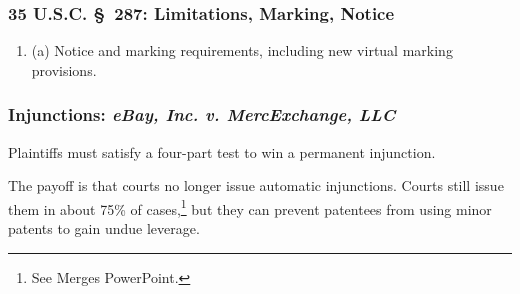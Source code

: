 \subsubsection{35 U.S.C. \S\ 287: Limitations, Marking, Notice}

\begin{enumerate}
    \item (a) Notice and marking requirements, including new virtual marking 
    provisions.
\end{enumerate}

\subsubsection{Injunctions: \emph{eBay, Inc. v. MercExchange, LLC}}

Plaintiffs must satisfy a four-part test to win a permanent injunction.

The payoff is that courts no longer issue automatic injunctions. Courts still 
issue them in about 75\% of cases,\footnote{See Merges PowerPoint.} but they 
can prevent patentees from using minor patents to gain undue leverage.

